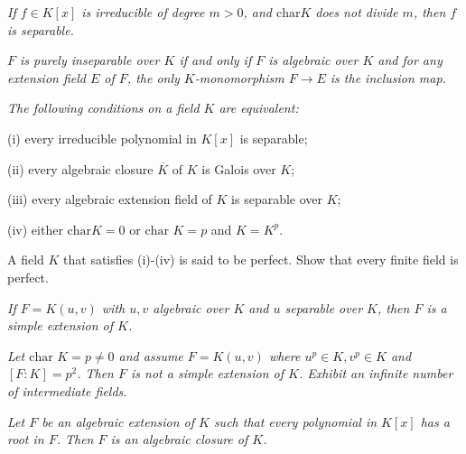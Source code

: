 \begin{problem}\em
If $f\in K[x]$ is irreducible of degree $m>0$, and $\mathrm{char}K$ does not divide $m$, then $f$ is separable.
\end{problem}
\begin{problem}\em
$F$ is purely inseparable over $K$ if and only if $F$ is algebraic over $K$ and for any extension field $E$ of $F$, the only $K$-monomorphism $F\to E$ is the inclusion map.
\end{problem}
\begin{problem}\em
The following conditions on a field $K$ are equivalent:\par
(i) every irreducible polynomial in $K[x]$ is separable;\par
(ii) every algebraic closure $\overline{K}$ of $K$ is Galois over $K$;\par
(iii) every algebraic extension field of $K$ is separable over $K$;\par
(iv) either $\mathrm{char}K=0$ or $\text{char }K=p$ and $K=K^p$.\par
A field $K$ that satisfies (i)-(iv) is said to be perfect. Show that every finite field is perfect.
\end{problem}
\begin{problem}\em
If $F=K(u, v)$ with $u, v$ algebraic over $K$ and $u$ separable over $K$, then $F$ is a simple extension of $K$.
\end{problem}
\begin{problem}\em
Let $\text{char }K=p\neq 0$ and assume $F=K(u, v)$ where $u^p\in K, v^p\in K$ and $[F:K]=p^2$. Then $F$ is not a simple extension of $K$. Exhibit an infinite number of intermediate fields.
\end{problem}
\begin{problem}\em
Let $F$ be an algebraic extension of $K$ such that every polynomial in $K[x]$ has a root in $F$. Then $F$ is an algebraic closure of $K$.
\end{problem}